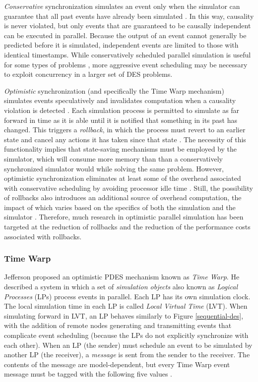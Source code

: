 \documentclass[11pt]{book}
\begin{document}
\textit{Conservative} synchronization simulates an event only when the simulator can
guarantee that all past events have already been simulated \cite{chandy-79,fujimoto-90}.
In this way, causality is never violated, but only events that are guaranteed to be
causally independent can be executed in parallel.  Because the output of an event cannot
generally be predicted before it is simulated, independent events are limited to those
with identical timestamps.  While conservatively scheduled parallel simulation is useful
for some types of problems \cite{nicol-93b}, more aggressive event scheduling may be
necessary to exploit concurrency in a larger set of DES problems.

\textit{Optimistic} synchronization (and specifically the Time Warp mechanism) simulates
events speculatively and invalidates computation when a causality violation is detected
\cite{fujimoto-90,jefferson-85}.  Each simulation process is permitted to simulate as far
forward in time as it is able until it is notified that something in its past has changed.
This triggers a \textit{rollback}, in which the process must revert to an earlier state
and cancel any actions it has taken since that state \cite{nicol-93b}.  The necessity of
this functionality implies that state-saving mechanisms must be employed by the simulator,
which will consume more memory than than a conservatively synchronized simulator would
while solving the same problem.  However, optimistic synchronization eliminates at least
some of the overhead associated with conservative scheduling by avoiding processor idle
time \cite{nicol-93b}.  Still, the possibility of rollbacks also introduces an additional
source of overhead computation, the impact of which varies based on the specifics of both
the simulation and the simulator \cite{fujimoto-pdes}.  Therefore, much research in
optimistic parallel simulation has been targeted at the reduction of rollbacks and the
reduction of the performance costs associated with rollbacks.

\subsubsection{Time Warp}\label{time-warp}

Jefferson \cite{jefferson-85} proposed an optimistic PDES mechanism known as \textit{Time
  Warp}.  He described a system in which a set of \textit{simulation objects} also known
as \textit{Logical Processes} (LPs) process events in parallel.  Each LP has its own
simulation clock.  The local simulation time in each LP is called \textit{Local Virtual
  Time} (LVT). When simulating forward in LVT, an LP behaves similarly to Figure
\ref{sequential-des}, with the addition of remote nodes generating and transmitting events
that complicate event scheduling (because the LPs do not explicitly synchronize with each
other).  When an LP (the sender) must schedule an event to be simulated by another LP (the
receiver), a \textit{message} is sent from the sender to the receiver.  The contents of
the message are model-dependent, but every Time Warp event message must be tagged with the
following five values \cite{jefferson-85}.
\end{document}
